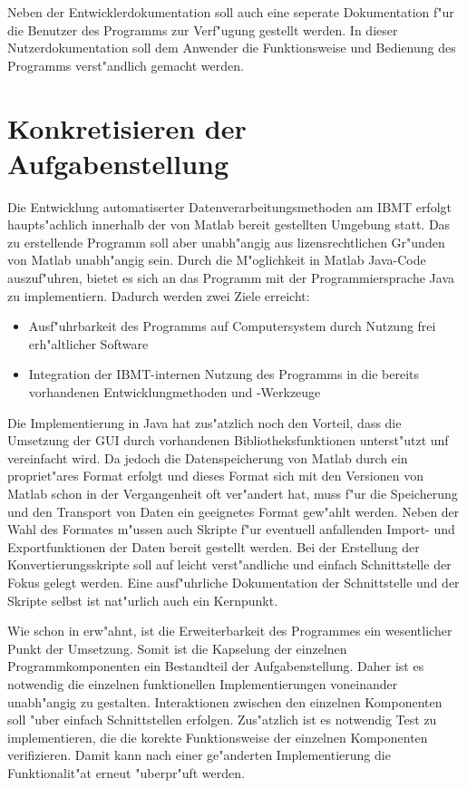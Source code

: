 Neben der Entwicklerdokumentation soll auch eine seperate Dokumentation f"ur die Benutzer des Programms zur Verf"ugung gestellt werden.
In dieser Nutzerdokumentation soll dem Anwender die Funktionsweise und Bedienung des Programms verst"andlich gemacht werden.

\section{Konkretisieren der Aufgabenstellung}

Die Entwicklung automatiserter Datenverarbeitungsmethoden am \ac{IBMT} erfolgt haupts"achlich innerhalb der von Matlab bereit gestellten Umgebung statt.
Das zu erstellende Programm soll aber unabh"angig aus lizensrechtlichen Gr"unden von Matlab unabh"angig sein.
Durch die M"oglichkeit in Matlab Java-Code auszuf"uhren, bietet es sich an das Programm mit der Programmiersprache Java zu implementiern.
Dadurch werden zwei Ziele erreicht:
\begin{itemize}
	\item Ausf"uhrbarkeit des Programms auf Computersystem durch Nutzung frei erh"altlicher Software
	\item Integration der \ac{IBMT}-internen Nutzung des Programms in die bereits vorhandenen Entwicklungmethoden und -Werkzeuge
\end{itemize}
Die Implementierung in Java hat zus"atzlich noch den Vorteil, dass die Umsetzung der \ac{GUI} durch vorhandenen Bibliotheksfunktionen unterst"utzt unf vereinfacht wird.
Da jedoch die Datenspeicherung von Matlab durch ein propriet"ares Format erfolgt und dieses Format sich mit den Versionen von Matlab schon in der Vergangenheit oft ver"andert hat, muss f"ur die Speicherung und den Transport von Daten ein geeignetes Format gew"ahlt werden.
Neben der Wahl des Formates m"ussen auch Skripte f"ur eventuell anfallenden Import- und Exportfunktionen der Daten bereit gestellt werden.
Bei der Erstellung der Konvertierungsskripte soll auf leicht verst"andliche und einfach Schnittstelle der Fokus gelegt werden.
Eine ausf"uhrliche Dokumentation der Schnittstelle und der Skripte selbst ist nat"urlich auch ein Kernpunkt.

Wie schon in  erw"ahnt, ist die Erweiterbarkeit des Programmes ein wesentlicher Punkt der Umsetzung.
Somit ist die Kapselung der einzelnen Programmkomponenten ein Bestandteil der Aufgabenstellung.
Daher ist es notwendig die einzelnen funktionellen Implementierungen voneinander unabh"angig zu gestalten.
Interaktionen zwischen den einzelnen Komponenten soll "uber einfach Schnittstellen erfolgen.
Zus"atzlich ist es notwendig Test zu implementieren, die die korekte Funktionsweise der einzelnen Komponenten verifizieren.
Damit kann nach einer ge"anderten Implementierung die Funktionalit"at erneut "uberpr"uft werden.

